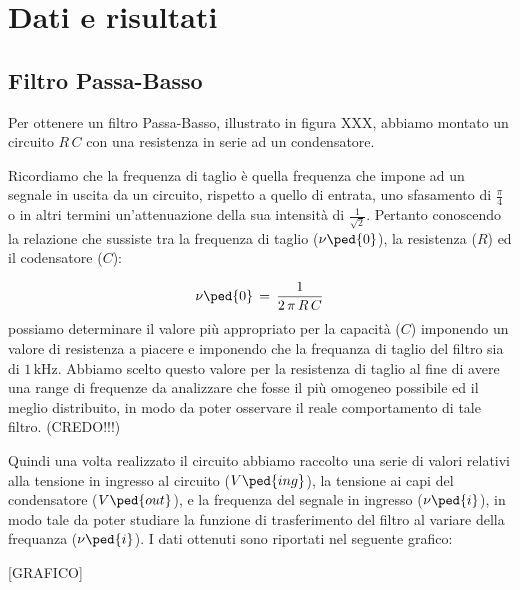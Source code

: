 \section*{Dati e risultati}

\subsection*{Filtro Passa-Basso}

Per ottenere un filtro Passa-Basso, illustrato in figura XXX, abbiamo montato un circuito $R\,C$ con una resistenza in serie ad un condensatore.

Ricordiamo che la frequenza di taglio è quella frequenza che impone ad un segnale in uscita da un circuito, rispetto a quello di entrata, uno sfasamento di $\frac{\pi}{4}$ o in altri termini un'attenuazione della sua intensità di $\frac{1}{\sqrt{2}}$.
Pertanto conoscendo la relazione che sussiste tra la frequenza di taglio ($\nu\ped{0}$), la resistenza ($R$) ed il codensatore ($C$):

\begin{equation}
	\nu\ped{0} \,=\, \frac{1}{2\,\pi\,R\,C}
	\label{eq:taglio basso}
\end{equation}
%
possiamo determinare il valore più appropriato per la capacità ($C$) imponendo un valore di resistenza a piacere e imponendo che la frequanza di taglio del filtro sia di $1\,\si{\kilo\hertz}$. Abbiamo scelto questo valore per la resistenza di taglio al fine di avere una range di frequenze da analizzare che fosse il più omogeneo possibile ed il meglio distribuito, in modo da poter osservare il reale comportamento di tale filtro. (CREDO!!!)

Quindi una volta realizzato il circuito abbiamo raccolto una serie di valori relativi alla tensione in ingresso al circuito ($V\ped{ing}$), la tensione ai capi del condensatore ($V\ped{out}$), e la frequenza del segnale in ingresso ($\nu\ped{i}$), in modo tale da poter studiare la funzione di trasferimento del filtro al variare della frequanza ($\nu\ped{i}$).
I dati ottenuti sono riportati nel seguente grafico:

[GRAFICO]

